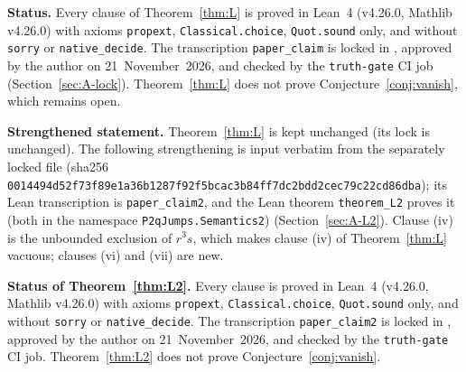 \documentclass[11pt,reqno]{amsart}
\theoremstyle{definition}
\begin{document}


\noindent\textbf{Status.} Every clause of Theorem~\ref{thm:L} is proved in Lean~4 (v4.26.0, Mathlib v4.26.0) with axioms \texttt{propext}, \texttt{Classical.choice}, \texttt{Quot.sound} only, and without \texttt{sorry} or \texttt{native\_decide}. The transcription \texttt{paper\_claim} is locked in , approved by the author on 21~November~2026, and checked by the \texttt{truth-gate} CI job (Section~\ref{sec:A-lock}). Theorem~\ref{thm:L} does not prove Conjecture~\ref{conj:vanish}, which remains open.

\medskip
\noindent\textbf{Strengthened statement.} Theorem~\ref{thm:L} is kept unchanged (its lock is unchanged). The following strengthening is input verbatim from the separately locked file  (sha256 \texttt{0014494d52\allowbreak{}f73f89e1a3\allowbreak{}6b1287f92f\allowbreak{}5bcac3b84f\allowbreak{}f7dc2bdd2c\allowbreak{}ec79c22cd8\allowbreak{}6dba}); its Lean transcription is \texttt{paper\_claim2}, and the Lean theorem \texttt{theorem\_L2} proves it (both in the namespace \texttt{P2qJumps.Semantics2}) (Section~\ref{sec:A-L2}). Clause (iv) is the unbounded exclusion of \(r^3s\), which makes clause (iv) of Theorem~\ref{thm:L} vacuous; clauses (vi) and (vii) are new.



\noindent\textbf{Status of Theorem~\ref{thm:L2}.} Every clause is proved in Lean~4 (v4.26.0, Mathlib v4.26.0) with axioms \texttt{propext}, \texttt{Classical.choice}, \texttt{Quot.sound} only, and without \texttt{sorry} or \texttt{native\_decide}. The transcription \texttt{paper\_claim2} is locked in , approved by the author on 21~November~2026, and checked by the \texttt{truth-gate} CI job. Theorem~\ref{thm:L2} does not prove Conjecture~\ref{conj:vanish}.
\end{document}
